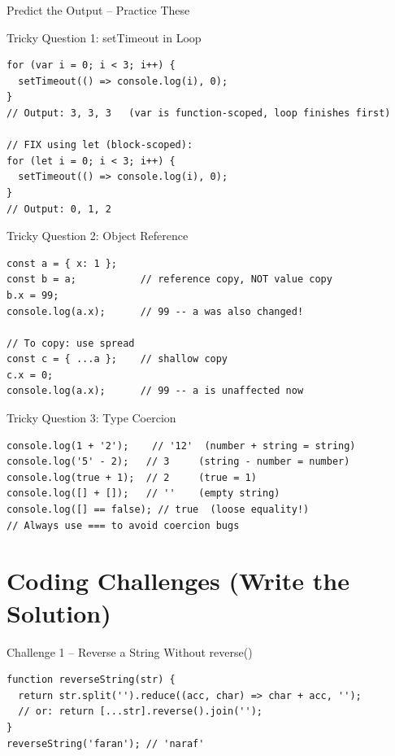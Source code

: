 \documentclass[12pt,a4paper]{article}
\begin{document}
\begin{infobox}{Predict the Output -- Practice These}
\begin{codebox}{Tricky Question 1: setTimeout in Loop}
\begin{lstlisting}
for (var i = 0; i < 3; i++) {
  setTimeout(() => console.log(i), 0);
}
// Output: 3, 3, 3   (var is function-scoped, loop finishes first)

// FIX using let (block-scoped):
for (let i = 0; i < 3; i++) {
  setTimeout(() => console.log(i), 0);
}
// Output: 0, 1, 2
\end{lstlisting}
\end{codebox}

\begin{codebox}{Tricky Question 2: Object Reference}
\begin{lstlisting}
const a = { x: 1 };
const b = a;           // reference copy, NOT value copy
b.x = 99;
console.log(a.x);      // 99 -- a was also changed!

// To copy: use spread
const c = { ...a };    // shallow copy
c.x = 0;
console.log(a.x);      // 99 -- a is unaffected now
\end{lstlisting}
\end{codebox}

\begin{codebox}{Tricky Question 3: Type Coercion}
\begin{lstlisting}
console.log(1 + '2');    // '12'  (number + string = string)
console.log('5' - 2);   // 3     (string - number = number)
console.log(true + 1);  // 2     (true = 1)
console.log([] + []);   // ''    (empty string)
console.log([] == false); // true  (loose equality!)
// Always use === to avoid coercion bugs
\end{lstlisting}
\end{codebox}
\end{infobox}

\newpage

\section{Coding Challenges (Write the Solution)}

\begin{codebox}{Challenge 1 -- Reverse a String Without reverse()}
\begin{lstlisting}
function reverseString(str) {
  return str.split('').reduce((acc, char) => char + acc, '');
  // or: return [...str].reverse().join('');
}
reverseString('faran'); // 'naraf'
\end{lstlisting}
\end{codebox}
\end{document}
